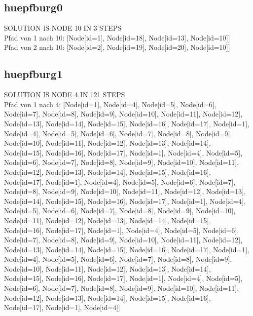 \subsection{huepfburg0}\label{subsec:huepfburg0}
SOLUTION IS NODE 10 IN 3 STEPS \\
Pfad von 1 nach 10: [Node[id=1], Node[id=18], Node[id=13], Node[id=10]] \\
Pfad von 2 nach 10: [Node[id=2], Node[id=19], Node[id=20], Node[id=10]]

\subsection{huepfburg1}\label{subsec:huepfburg1}
SOLUTION IS NODE 4 IN 121 STEPS \\
Pfad von 1 nach 4: [Node[id=1], Node[id=4], Node[id=5], Node[id=6], Node[id=7], Node[id=8], Node[id=9], Node[id=10], Node[id=11], Node[id=12], Node[id=13], Node[id=14], Node[id=15], Node[id=16], Node[id=17], Node[id=1], Node[id=4], Node[id=5], Node[id=6], Node[id=7], Node[id=8], Node[id=9], Node[id=10], Node[id=11], Node[id=12], Node[id=13], Node[id=14], Node[id=15], Node[id=16], Node[id=17], Node[id=1], Node[id=4], Node[id=5], Node[id=6], Node[id=7], Node[id=8], Node[id=9], Node[id=10], Node[id=11], Node[id=12], Node[id=13], Node[id=14], Node[id=15], Node[id=16], Node[id=17], Node[id=1], Node[id=4], Node[id=5], Node[id=6], Node[id=7], Node[id=8], Node[id=9], Node[id=10], Node[id=11], Node[id=12], Node[id=13], Node[id=14], Node[id=15], Node[id=16], Node[id=17], Node[id=1], Node[id=4], Node[id=5], Node[id=6], Node[id=7], Node[id=8], Node[id=9], Node[id=10], Node[id=11], Node[id=12], Node[id=13], Node[id=14], Node[id=15], Node[id=16], Node[id=17], Node[id=1], Node[id=4], Node[id=5], Node[id=6], Node[id=7], Node[id=8], Node[id=9], Node[id=10], Node[id=11], Node[id=12], Node[id=13], Node[id=14], Node[id=15], Node[id=16], Node[id=17], Node[id=1], Node[id=4], Node[id=5], Node[id=6], Node[id=7], Node[id=8], Node[id=9], Node[id=10], Node[id=11], Node[id=12], Node[id=13], Node[id=14], Node[id=15], Node[id=16], Node[id=17], Node[id=1], Node[id=4], Node[id=5], Node[id=6], Node[id=7], Node[id=8], Node[id=9], Node[id=10], Node[id=11], Node[id=12], Node[id=13], Node[id=14], Node[id=15], Node[id=16], Node[id=17], Node[id=1], Node[id=4]] \\
